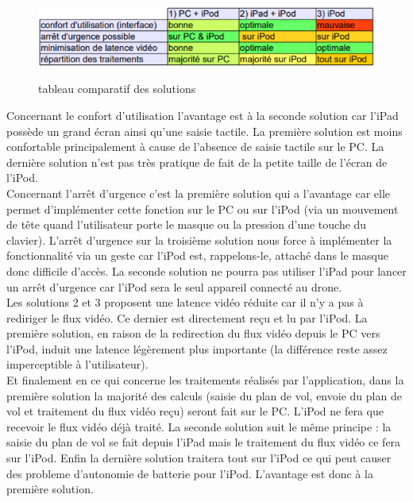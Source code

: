 \documentclass{article}
\begin{document}
		\begin{figure}[h]
		\begin{center}
		\includegraphics{comparatif_v3.PNG}\\
		\caption{tableau comparatif des solutions}
		\end{center}
		\end{figure}
		


		\indent Concernant le confort d'utilisation l'avantage est à la seconde solution car l'iPad possède un grand écran ainsi qu'une saisie tactile. La première solution est moins confortable principalement à cause de l'absence de saisie tactile sur le PC. La dernière solution n'est pas très pratique de fait de la petite taille de l'écran de l'iPod.\\
		
        \indent Concernant l'arrêt d'urgence c'est la première solution qui a l'avantage car elle permet d'implémenter cette fonction sur le PC ou sur l'iPod (via un mouvement de tête quand l'utilisateur porte le masque ou la pression d'une touche du clavier). L'arrêt d'urgence sur la troisième solution nous force à implémenter la fonctionnalité via un geste car l'iPod est, rappelons-le, attaché dans le masque donc difficile d'accès. La seconde solution ne pourra pas utiliser l'iPad pour lancer un arrêt d'urgence car l'iPod sera le seul appareil connecté au drone.\\
        
        \indent Les solutions 2 et 3 proposent une latence vidéo réduite car il n'y a pas à rediriger le flux vidéo. Ce dernier est directement reçu et lu par l'iPod. La première solution, en raison de la redirection du flux vidéo depuis le PC vers l'iPod, induit une latence légèrement plus importante (la différence reste assez imperceptible à l'utilisateur).\\
        
        \indent Et finalement en ce qui concerne les traitements réalisés par l'application, dans la première solution la majorité des calculs (saisie du plan de vol, envoie du plan de vol et traitement du flux vidéo reçu) seront fait sur le PC. L'iPod ne fera que recevoir le flux vidéo déjà traité. La seconde solution suit le même principe : la saisie du plan de vol se fait depuis l'iPad mais le traitement du flux vidéo ce fera sur l'iPod. Enfin la dernière solution traitera tout sur l'iPod ce qui peut causer des probleme d'autonomie de batterie pour l'iPod. L'avantage est donc à la première solution.\\ \\
        
\end{document}
